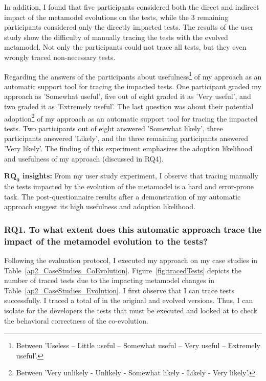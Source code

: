 {	In addition, I found that five participants considered both the direct and indirect impact of the metamodel evolutions on the tests, while the 3 remaining participants considered only the directly impacted tests. 
	The results of the user study show the difficulty of manually tracing the tests with the evolved metamodel. Not only the participants could not trace all tests, but they even wrongly traced non-necessary tests. 
	
	Regarding the answers of the participants about usefulness\footnote{Between 'Useless – Little useful – Somewhat useful – Very useful – Extremely useful'.} of my approach as an automatic support tool for tracing the impacted tests. One participant graded my approach as 'Somewhat useful', five out of eight graded it as 'Very useful', and two graded it as 'Extremely useful'. The last question was about their potential adoption\footnote{Between 'Very unlikely - Unlikely - Somewhat likely - Likely - Very likely'.}%
	of my approach as an automatic support tool for tracing the impacted tests. Two participants out of eight answered 'Somewhat likely', three participants answered 'Likely', and the three remaining participants answered 'Very likely'. The finding of this experiment emphasizes the adoption likelihood and usefulness of my approach (discussed in RQ4).
	
	\begin{tcolorbox}[boxsep=-2pt]
		\textbf{$\boldsymbol{RQ_0}$ insights:}
		From my user study experiment, I observe that tracing manually the tests impacted by the evolution of the metamodel is a hard and error-prone task. The post-questionnaire results after a demonstration of my automatic approach suggest its high usefulness and adoption likelihood.
	\end{tcolorbox}
	
}

\subsubsection{RQ1. To what extent does this automatic approach trace the impact of the metamodel evolution to the tests?}

Following the evaluation protocol, I executed my approach on my case studies in Table~\ref{ap2_CaseStudies_CoEvolution}. Figure~\ref{fig:tracedTests} depicts the number of traced tests due to the impacting metamodel changes in Table~\ref{ap2_CaseStudies_Evolution}. I first observe that I can trace tests successfully. I traced a total of  in the original and evolved versions. Thus, I can isolate for the developers the tests that must be executed and looked at to check the behavioral correctness of the co-evolution. 

